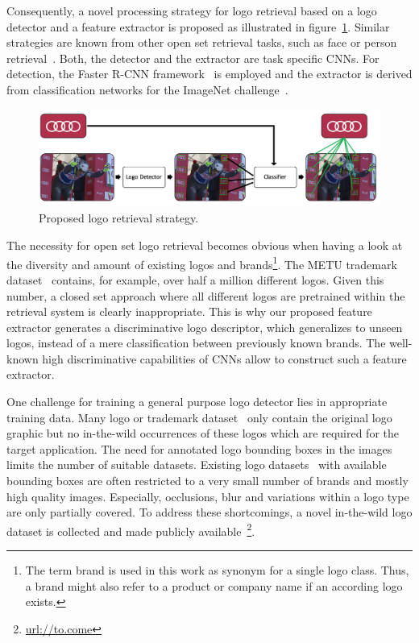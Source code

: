 \documentclass[a4paper,twoside]{article}
\begin{document}
Consequently, a novel processing strategy for logo retrieval based on a logo detector and a feature extractor is proposed as illustrated in figure~\ref{fig:pipeline}. Similar strategies are known from other open set retrieval tasks, such as face or person retrieval~\cite{bauml2010,herrmann2015b}. Both, the detector and the extractor are task specific \acp{CNN}. For detection, the Faster R-CNN framework~\cite{ren2015} is employed and the extractor is derived from classification networks for the ImageNet challenge~\cite{deng2009}.
%
\begin{figure}[t]
  \centering
  \includegraphics[width=\linewidth]{img/outline.png}
  \caption{Proposed logo retrieval strategy.}
  \label{fig:pipeline}
\end{figure}

The necessity for open set logo retrieval becomes obvious when having a look at the diversity and amount of existing logos and brands\footnote{The term brand is used in this work as synonym for a single logo class. Thus, a brand might also refer to a product or company name if an according logo exists.}. The METU trademark dataset~\cite{tursun2017} contains, for example, over half a million different logos. Given this number, a closed set approach where all different logos are pretrained within the retrieval system is clearly inappropriate.
This is why our proposed feature extractor generates a discriminative logo descriptor, which generalizes to unseen logos, instead of a mere classification between previously known brands. The well-known high discriminative capabilities of \acp{CNN} allow to construct such a feature extractor.

One challenge for training a general purpose logo detector lies in appropriate training data. Many logo or trademark dataset~\cite{eakins1998,hoi2015,tursun2017} only contain the original logo graphic but no in-the-wild occurrences of these logos which are required for the target application. The need for annotated logo bounding boxes in the images limits the number of suitable datasets. Existing logo datasets~\cite{joly2009,kalantidis2011,romberg2011,letessier2012,bianco2015,su2016,bianco2017} with available bounding boxes are often restricted to a very small number of brands and mostly high quality images. Especially, occlusions, blur and variations within a logo type are only partially covered.
To address these shortcomings, a novel in-the-wild logo dataset is collected and made publicly available~\footnote{\url{url://to.come}}.
\end{document}
